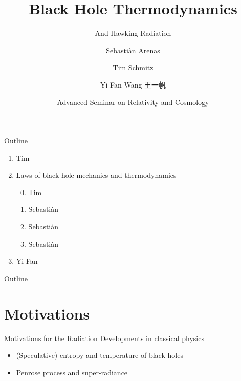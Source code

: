 \documentclass{beamer}
\title%
{Black Hole Thermodynamics}
\subtitle{And Hawking Radiation}
\author[Arenas, Schmitz, Wang] %
{Sebastiàn Arenas \and Tim Schmitz \and Yi-Fan Wang 王一帆}
\date{Advanced Seminar on Relativity and Cosmology}
\begin{document}
\begin{frame}%
  \titlepage
\end{frame}

\begin{frame}{Outline}
\begin{enumerate}
\item { Tim}
\item {Laws of black hole mechanics and thermodynamics}
	\begin{enumerate}
	\setcounter{enumii}{-1}
	\item { Tim}
	\item { Sebastiàn}
	\item { Sebastiàn}
	\item { Sebastiàn}
	\end{enumerate}
\item { Yi-Fan}
\end{enumerate}
\end{frame}

\begin{frame}{Outline}
  \tableofcontents
\end{frame}

\section{Motivations}

\begin{frame}{Motivations for the Radiation}%
{Developments in classical physics}
\begin{itemize}
\item (Speculative) entropy and temperature of black holes
	\cite{Bekenstein1973,Bekenstein1980}
\item Penrose process and super-radiance
\end{itemize}

\end{frame}
\end{document}

